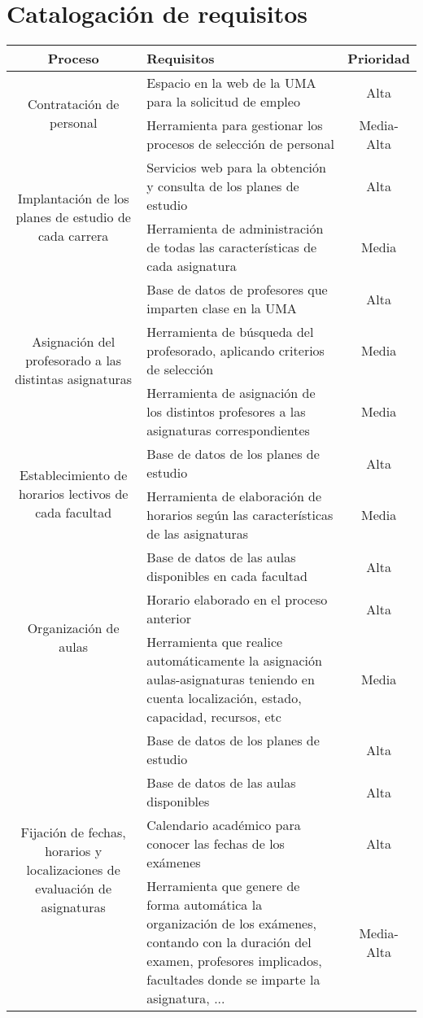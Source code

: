 \documentclass[11pt,a4paper,spanish,twoside]{book}
\begin{document}
\section{Catalogación de requisitos}
\begin{table}[!h]
\centering
  \begin{tabular}{clc}
    \textbf{Proceso} & \textbf{Requisitos} & \textbf{Prioridad} \\ \hline
    \hline \hline
     \multirow{2}{*}{Contratación de personal}
     & Espacio en la web de la UMA para la solicitud de empleo & Alta\\
     & Herramienta para gestionar los procesos de selección de personal &
     Media-Alta\\

     \multirow{2}{*}{Implantación de los planes de estudio de cada
       carrera}
     & Servicios web para la obtención y consulta de los planes de estudio &
     Alta\\
     & Herramienta de administración de todas las características de cada
     asignatura & Media\\ 

     \multirow{3}{*}{Asignación del profesorado a las distintas asignaturas}
     & Base de datos de profesores que imparten clase en la UMA & Alta \\ 
     & Herramienta de búsqueda del profesorado, aplicando criterios de selección
     & Media\\ 
     & Herramienta de asignación de los distintos profesores a las
     asignaturas correspondientes & Media\\ 
     
     \multirow{2}{*}{Establecimiento de horarios lectivos de cada facultad}
     & Base de datos de los planes de estudio & Alta\\ 
     & Herramienta de elaboración de horarios según las características de
     las asignaturas & Media \\

     \multirow{3}{*}{Organización de aulas}
     & Base de datos de las aulas disponibles en cada facultad & Alta\\
     & Horario elaborado en el proceso anterior & Alta \\
     & Herramienta que realice automáticamente la asignación
     aulas-asignaturas teniendo en cuenta localización, estado, capacidad,
     recursos, etc & Media \\

     \multirow{4}{*}{Fijación de fechas, horarios y localizaciones de
       evaluación de asignaturas} 
     & Base de datos de los planes de estudio & Alta \\
     & Base de datos de las aulas disponibles & Alta \\
     & Calendario académico para conocer las fechas de los exámenes & Alta \\
     & Herramienta que genere de forma automática la organización de los
     exámenes, contando con la duración del examen, profesores implicados,
     facultades donde se imparte la asignatura, ... & Media-Alta \\
     

\end{tabular}
\end{table}
\end{document}
